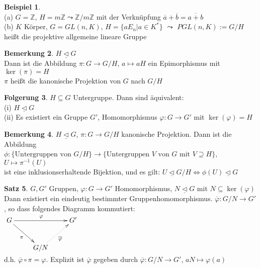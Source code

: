 \documentclass[10pt,a4paper,numbers=endperiod]{scrreprt}
\theoremstyle{definition}
\newtheorem{satz}{Satz}[section]
\newtheorem{bem}[satz]{Bemerkung}
\newtheorem{bsp}[satz]{Beispiel}
\newtheorem{folg}[satz]{Folgerung}
\def\ZZ{{\mathbb Z}}
\begin{document}
\begin{bsp}
	$ $\\
	(a) $G = \ZZ$, $H = m \ZZ \leadsto \ZZ/m\ZZ$ mit der Verknüpfung $\overline{a} + \overline{b} = \overline{a+b}$\\
	(b) $K$ Körper, $G = GL(n,K)$, $H = \{aE_n| a \in K^*\}$ $\leadsto$ $PGL(n,K) := G/H$ heißt die projektive allgemeine lineare Gruppe
\end{bsp}

\begin{bem}
	$H \underline{\vartriangleleft} G$\\
	Dann ist die Abbildung $\pi: G \rightarrow G/H$, $a \mapsto aH$ ein Epimorphismus mit $\ker(\pi) = H$\\
	$\pi$ heißt die kanonische Projektion von $G$ nach $G/H$
\end{bem}

\begin{folg}
	$H\subseteq G$ Untergruppe. Dann sind äquivalent:\\
	(i) $H \underline{\vartriangleleft} G$\\
	(ii) Es existiert ein Gruppe $G'$, Homomorphismus $\varphi: G \rightarrow G'$ mit $\ker(\varphi) = H$\\
\end{folg}

\begin{bem}
	$H \underline{\vartriangleleft} G$, $\pi: G \rightarrow G/H$ kanonische Projektion. Dann ist die Abbildung\\
	$\phi: \{\text{Untergruppen von $G/H$}\} \rightarrow \{ \text{Untergruppen $V$ von $G$ mit $V \supseteq H$}\}$, $U \mapsto \pi^{-1} (U)$\\
	ist eine inklusionserhaltende Bijektion, und es gilt: $U \underline{\vartriangleleft} G/H \Leftrightarrow \phi(U) \underline{\vartriangleleft} G$
\end{bem}

\begin{satz}
	$G, G'$ Gruppen, $\varphi: G \rightarrow G'$ Homomorphismus, $N\underline{\vartriangleleft} G$ mit $N \subseteq \ker(\varphi)$ Dann existiert ein eindeutig bestimmter Gruppenhomomorphismus. $\overline{\varphi}: G/N \rightarrow G'$, so dass folgendes Diagramm kommutiert:\\ 
	$\begin{xy}
	\xymatrix{
		G \ar[rr]^{\varphi} \ar[dr]_\pi &     &  G' \\
									   & G/N \ar@{.>}[ur]_{\overline{\varphi}}  
	}
	\end{xy}$\\
	d.h. $\overline{\varphi} \circ \pi = \varphi$. Explizit ist $\overline{\varphi}$ gegeben durch $\overline{\varphi}: G/N \rightarrow G'$, $aN \mapsto \varphi(a)$
\end{satz}
\end{document}
